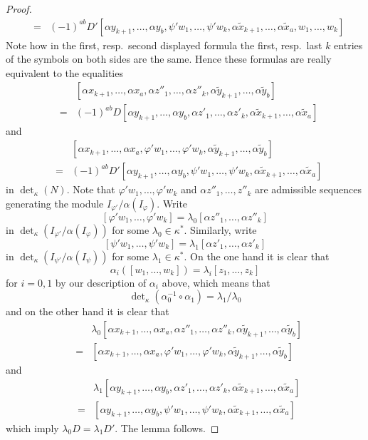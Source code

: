 \begin{proof}
\begin{eqnarray*}
& = &
(-1)^{ab} D'
[\alpha y_{k + 1}, \ldots, \alpha y_b,
\psi' w_1, \ldots, \psi' w_k,
\alpha \tilde x_{k + 1}, \ldots, \alpha \tilde x_a,
w_1, \ldots, w_k]
\end{eqnarray*}
Note how in the first, resp.\ second displayed formula
the first, resp.\ last $k$ entries of the symbols on both sides
are the same. Hence these formulas are really equivalent to the
equalities
\begin{eqnarray*}
& &
[\alpha x_{k + 1}, \ldots, \alpha x_a,
\alpha z''_1, \ldots, \alpha z''_k,
\alpha \tilde y_{k + 1}, \ldots, \alpha \tilde y_b] \\
& = &
(-1)^{ab} D
[\alpha y_{k + 1}, \ldots, \alpha y_b,
\alpha z'_1, \ldots, \alpha z'_k,
\alpha \tilde x_{k + 1}, \ldots, \alpha \tilde x_a]
\end{eqnarray*}
and
\begin{eqnarray*}
& &
[\alpha x_{k + 1}, \ldots, \alpha x_a,
\varphi' w_1, \ldots, \varphi' w_k,
\alpha \tilde y_{k + 1}, \ldots, \alpha \tilde y_b]
\\
& = &
(-1)^{ab} D'
[\alpha y_{k + 1}, \ldots, \alpha y_b,
\psi' w_1, \ldots, \psi' w_k,
\alpha \tilde x_{k + 1}, \ldots, \alpha \tilde x_a]
\end{eqnarray*}
in $\det_\kappa(N)$. Note that
$\varphi' w_1, \ldots, \varphi' w_k$
and
$\alpha z''_1, \ldots, z''_k$
are admissible sequences generating the module
$I_{\varphi'}/\alpha(I_\varphi)$. Write
$$
[\varphi' w_1, \ldots, \varphi' w_k]
= \lambda_0 [\alpha z''_1, \ldots, \alpha z''_k]
$$
in $\det_\kappa(I_{\varphi'}/\alpha(I_\varphi))$
for some $\lambda_0 \in \kappa^*$. Similarly,
write
$$
[\psi' w_1, \ldots, \psi' w_k]
= \lambda_1 [\alpha z'_1, \ldots, \alpha z'_k]
$$
in $\det_\kappa(I_{\psi'}/\alpha(I_\psi))$
for some $\lambda_1 \in \kappa^*$. On the one hand
it is clear that
$$
\alpha_i([w_1, \ldots, w_k]) = \lambda_i[z_1, \ldots, z_k]
$$
for $i = 0, 1$ by our description of $\alpha_i$ above,
which means that
$$
\det\nolimits_\kappa(\alpha_0^{-1} \circ \alpha_1)
=
\lambda_1/\lambda_0
$$
and
on the other hand it is clear that
\begin{eqnarray*}
& &
\lambda_0 [\alpha x_{k + 1}, \ldots, \alpha x_a,
\alpha z''_1, \ldots, \alpha z''_k,
\alpha \tilde y_{k + 1}, \ldots, \alpha \tilde y_b] \\
& = &
[\alpha x_{k + 1}, \ldots, \alpha x_a,
\varphi' w_1, \ldots, \varphi' w_k,
\alpha \tilde y_{k + 1}, \ldots, \alpha \tilde y_b]
\end{eqnarray*}
and
\begin{eqnarray*}
& &
\lambda_1[\alpha y_{k + 1}, \ldots, \alpha y_b,
\alpha z'_1, \ldots, \alpha z'_k,
\alpha \tilde x_{k + 1}, \ldots, \alpha \tilde x_a] \\
& = &
[\alpha y_{k + 1}, \ldots, \alpha y_b,
\psi' w_1, \ldots, \psi' w_k,
\alpha \tilde x_{k + 1}, \ldots, \alpha \tilde x_a]
\end{eqnarray*}
which imply $\lambda_0 D = \lambda_1 D'$. The lemma follows.
\end{proof}








